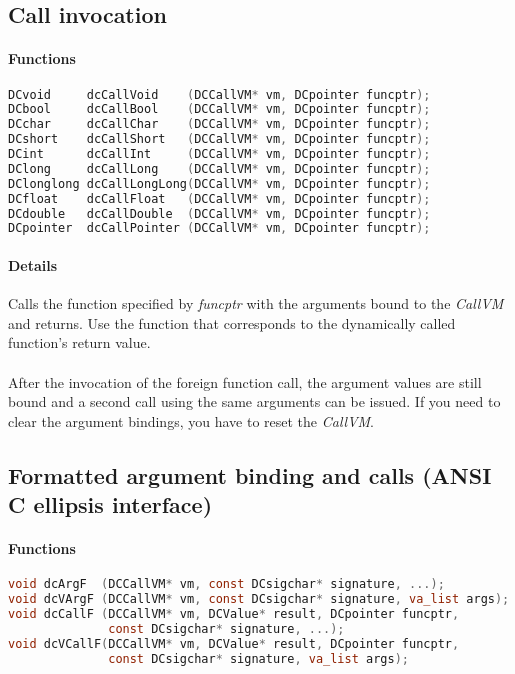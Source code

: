 \subsection{Call invocation}

\paragraph{Functions}

\begin{lstlisting}[language=c]
DCvoid     dcCallVoid    (DCCallVM* vm, DCpointer funcptr);
DCbool     dcCallBool    (DCCallVM* vm, DCpointer funcptr);
DCchar     dcCallChar    (DCCallVM* vm, DCpointer funcptr);
DCshort    dcCallShort   (DCCallVM* vm, DCpointer funcptr);
DCint      dcCallInt     (DCCallVM* vm, DCpointer funcptr);
DClong     dcCallLong    (DCCallVM* vm, DCpointer funcptr);
DClonglong dcCallLongLong(DCCallVM* vm, DCpointer funcptr);
DCfloat    dcCallFloat   (DCCallVM* vm, DCpointer funcptr);
DCdouble   dcCallDouble  (DCCallVM* vm, DCpointer funcptr);
DCpointer  dcCallPointer (DCCallVM* vm, DCpointer funcptr);
\end{lstlisting}

\paragraph{Details}
Calls the function specified by \emph{funcptr} with the arguments bound to
the \emph{CallVM} and returns. Use the function that corresponds to the
dynamically called function's return value.\\
\\
After the invocation of the foreign function call, the argument values are
still bound and a second call using the same arguments can be issued. If you
need to clear the argument bindings, you have to reset the \emph{CallVM}.

\subsection{Formatted argument binding and calls (ANSI C ellipsis interface)}

\paragraph{Functions}

\begin{lstlisting}[language=c]
void dcArgF  (DCCallVM* vm, const DCsigchar* signature, ...);
void dcVArgF (DCCallVM* vm, const DCsigchar* signature, va_list args);
void dcCallF (DCCallVM* vm, DCValue* result, DCpointer funcptr, 
              const DCsigchar* signature, ...);
void dcVCallF(DCCallVM* vm, DCValue* result, DCpointer funcptr, 
              const DCsigchar* signature, va_list args);
\end{lstlisting}

